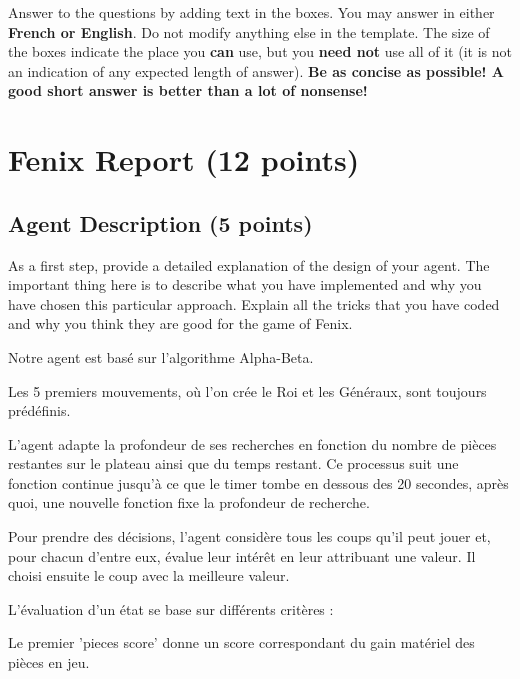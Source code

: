 \documentclass[11pt,a4paper]{report}
\begin{document}
\maketitle

Answer to the questions by adding text in the boxes. You may answer in either \textbf{French or English}. Do not modify anything else in the template.  The size of the boxes indicate the place you \textbf{can} use, but you \textbf{need not} use all of it (it is not an indication of any expected length of answer). \textbf{Be as concise as possible! A good short answer is better than a lot of nonsense!}

\section{Fenix Report (12 points)}

\subsection{Agent Description (5 points)}

As a first step, provide a detailed explanation of the design of your agent. The important thing here is to describe what you have implemented and why you have chosen this particular approach. Explain all the tricks that you have coded and why you think they are good for the game of Fenix.

\begin{answers}[10cm]
    Notre agent est basé sur l'algorithme Alpha-Beta. 

    Les 5 premiers mouvements, où l'on crée le Roi et les Généraux, sont toujours prédéfinis. 

    L'agent adapte la profondeur de ses recherches en fonction du nombre de pièces restantes sur le plateau ainsi que du temps restant. Ce processus suit une fonction continue jusqu'à ce que le timer tombe en dessous des 20 secondes, après quoi, une nouvelle fonction fixe la profondeur de recherche.

    Pour prendre des décisions, l'agent considère tous les coups qu'il peut jouer et, pour chacun d'entre eux, évalue leur intérêt en leur attribuant une valeur. Il choisi ensuite le coup avec la meilleure valeur.
    
    L'évaluation d'un état se base sur différents critères : 

    Le premier 'pieces score' donne un score correspondant du gain matériel des pièces en jeu. 

\end{answers}
\end{document}
